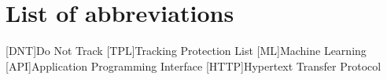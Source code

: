 \documentclass[oneside,11pt,titlepage,ngerman,a4paper,bibliography=totocnumbered,listof=numbered]{scrbook}
\begin{document}

\frontmatter



% 

\tableofcontents{}
\listoffigures{}
\listoftables
\chapter{List of abbreviations}
\begin{acronym}[eugh]
[DNT]{Do Not Track}
[TPL]{Tracking Protection List}
[ML]{Machine Learning}
[API]{Application Programming Interface}
[HTTP]{Hypertext Transfer Protocol}
\end{acronym}
\mainmatter









\backmatter



\setwidesite{}						%
\label{cha:bibliography}





%	
\end{document}
